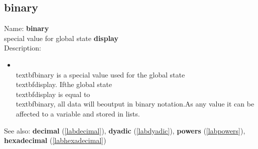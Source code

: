 \subsection{binary}
\label{labbinary}
\noindent Name: \textbf{binary}\\
special value for global state \textbf{display}\\
\noindent Description: \begin{itemize}

\item \\textbf{binary} is a special value used for the global state \\textbf{display}.  If\n   the global state \\textbf{display} is equal to \\textbf{binary}, all data will be\n   output in binary notation.\n    \n   As any value it can be affected to a variable and stored in lists.\n\end{itemize}
See also: \textbf{decimal} (\ref{labdecimal}), \textbf{dyadic} (\ref{labdyadic}), \textbf{powers} (\ref{labpowers}), \textbf{hexadecimal} (\ref{labhexadecimal})
